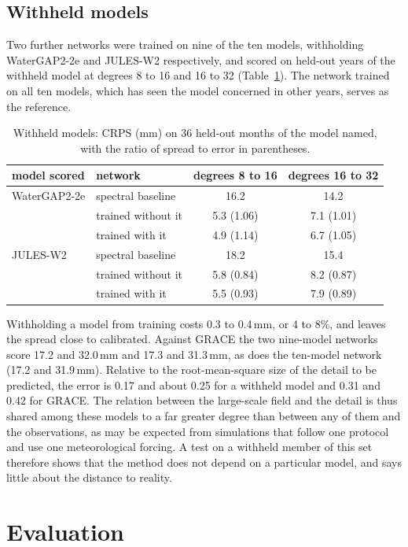 \documentclass[11pt,a4paper]{article}
\begin{document}
\subsection{Withheld models}\label{sec:loo}
Two further networks were trained on nine of the ten models, withholding WaterGAP2-2e and
JULES-W2 respectively, and scored on held-out years of the withheld model at degrees 8 to 16
and 16 to 32 (Table~\ref{tab:loo}). The network trained on all ten models, which has seen the
model concerned in other years, serves as the reference.

\begin{table}[ht]
\centering\small
\caption{Withheld models: CRPS (mm) on 36 held-out months of the model named, with the ratio
of spread to error in parentheses.}
\label{tab:loo}
\begin{tabular}{llcc}
  \toprule
  model scored & network & degrees 8 to 16 & degrees 16 to 32 \\
  \midrule
  WaterGAP2-2e & spectral baseline & 16.2 & 14.2 \\
               & trained without it & 5.3 (1.06) & 7.1 (1.01) \\
               & trained with it & 4.9 (1.14) & 6.7 (1.05) \\
  JULES-W2 & spectral baseline & 18.2 & 15.4 \\
           & trained without it & 5.8 (0.84) & 8.2 (0.87) \\
           & trained with it & 5.5 (0.93) & 7.9 (0.89) \\
  \bottomrule
\end{tabular}
\end{table}

Withholding a model from training costs 0.3 to 0.4\,mm, or 4 to 8\%, and leaves the spread
close to calibrated. Against GRACE the two nine-model networks score 17.2 and 32.0\,mm and
17.3 and 31.3\,mm, as does the ten-model network (17.2 and 31.9\,mm). Relative to the
root-mean-square size of the detail to be predicted, the error is 0.17 and about 0.25 for a
withheld model and 0.31 and 0.42 for GRACE. The relation between the large-scale field and
the detail is thus shared among these models to a far greater degree than between any of them
and the observations, as may be expected from simulations that follow one protocol and use
one meteorological forcing. A test on a withheld member of this set therefore shows that the
method does not depend on a particular model, and says little about the distance to reality.

\section{Evaluation}\label{sec:eval}
\end{document}
